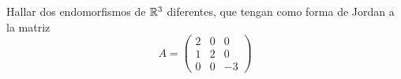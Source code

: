 \item Hallar dos endomorfismos de $\mathbb{R}^3$ diferentes, que tengan como forma de Jordan a la matriz\[A=\begin{pmatrix}
        2&0&0\\1&2&0\\0&0&-3
    \end{pmatrix}\]
    \begin{mdframed}[style=s]
        
    \end{mdframed}